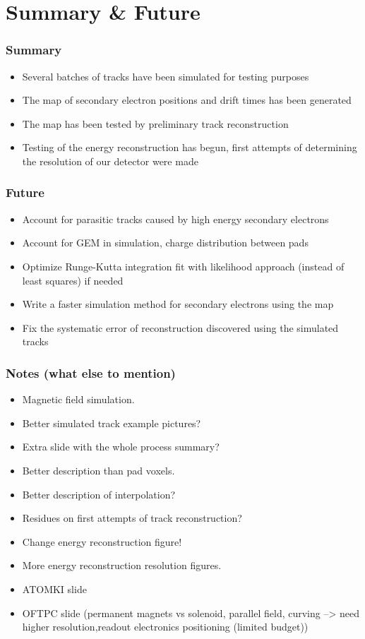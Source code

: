 \documentclass{beamer}
\begin{document}
	
	\section{Summary \& Future}	
	\begin{frame}
		\frametitle{Summary}
		\begin{itemize}
			\item Several batches of tracks have been simulated for testing purposes
			\item The map of secondary electron positions and drift times has been generated
			\item The map has been tested by preliminary track reconstruction
			\item Testing of the energy reconstruction has begun, first attempts of determining the resolution of our detector were made
		\end{itemize}
	\end{frame}
	\begin{frame}
		\frametitle{Future}
		\begin{itemize}
			\item Account for parasitic tracks caused by high energy secondary electrons
			\item Account for GEM in simulation, charge distribution between pads
			\item Optimize Runge-Kutta integration fit with likelihood approach (instead of least squares) if needed
			\item Write a faster simulation method for secondary electrons using the map
			\item Fix the systematic error of reconstruction discovered using the simulated tracks
		\end{itemize}
	\end{frame}
	\begin{frame}
		\frametitle{Notes (what else to mention)}
		\begin{itemize}
			\item Magnetic field simulation.
			\item Better simulated track example pictures?
			\item Extra slide with the whole process summary?
			\item Better description than pad voxels.
			\item Better description of interpolation?
			\item Residues on first attempts of track reconstruction?
			\item Change energy reconstruction figure!
			\item More energy reconstruction resolution figures.
			\item ATOMKI slide
			\item OFTPC slide (permanent magnets vs solenoid, parallel field, curving --> need higher resolution,readout electronics positioning (limited budget))
		\end{itemize}
	\end{frame}
	
\end{document}
